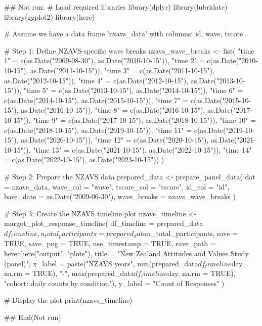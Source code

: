 \documentclass[a4paper]{book}
\begin{document}
%
\begin{Examples}
\begin{ExampleCode}
## Not run: 
# Load required libraries
library(dplyr)
library(lubridate)
library(ggplot2)
library(here)

# Assume we have a data frame 'nzavs_data' with columns: id, wave, tscore

# Step 1: Define NZAVS-specific wave breaks
nzavs_wave_breaks <- list(
  "time 1" = c(as.Date("2009-08-30"), as.Date("2010-10-15")),
  "time 2" = c(as.Date("2010-10-15"), as.Date("2011-10-15")),
  "time 3" = c(as.Date("2011-10-15"), as.Date("2012-10-15")),
  "time 4" = c(as.Date("2012-10-15"), as.Date("2013-10-15")),
  "time 5" = c(as.Date("2013-10-15"), as.Date("2014-10-15")),
  "time 6" = c(as.Date("2014-10-15"), as.Date("2015-10-15")),
  "time 7" = c(as.Date("2015-10-15"), as.Date("2016-10-15")),
  "time 8" = c(as.Date("2016-10-15"), as.Date("2017-10-15")),
  "time 9" = c(as.Date("2017-10-15"), as.Date("2018-10-15")),
  "time 10" = c(as.Date("2018-10-15"), as.Date("2019-10-15")),
  "time 11" = c(as.Date("2019-10-15"), as.Date("2020-10-15")),
  "time 12" = c(as.Date("2020-10-15"), as.Date("2021-10-15")),
  "time 13" = c(as.Date("2021-10-15"), as.Date("2022-10-15")),
  "time 14" = c(as.Date("2022-10-15"), as.Date("2023-10-15"))
)

# Step 2: Prepare the NZAVS data
prepared_data <- prepare_panel_data(
  dat = nzavs_data,
  wave_col = "wave",
  tscore_col = "tscore",
  id_col = "id",
  base_date = as.Date("2009-06-30"),
  wave_breaks = nzavs_wave_breaks
)

# Step 3: Create the NZAVS timeline plot
nzavs_timeline <- margot_plot_response_timeline(
  df_timeline = prepared_data$df_timeline,
  n_total_participants = prepared_data$n_total_participants,
  save = TRUE,
  save_png = TRUE,
  use_timestamp = TRUE,
  save_path = here::here("output", "plots"),
  title = "New Zealand Attitudes and Values Study (panel)",
  x_label = paste("NZAVS years",  min(prepared_data$df_timeline$day, na.rm = TRUE),
                  "-", max(prepared_data$df_timeline$day, na.rm = TRUE),
                  "cohort: daily counts by condition"),
  y_label = "Count of Responses"
)

# Display the plot
print(nzavs_timeline)

## End(Not run)

\end{ExampleCode}
\end{Examples}
\end{document}
